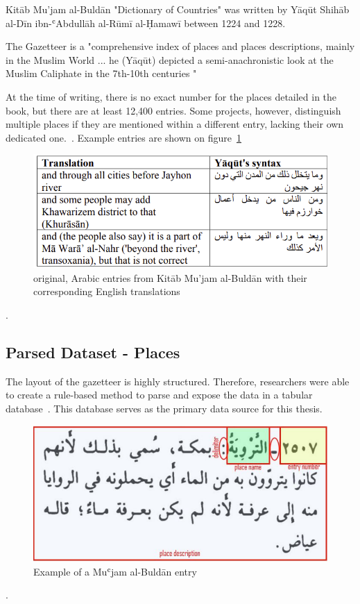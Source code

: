 Kitāb Mu'jam al-Buldān \cite{Yaqut} "Dictionary of Countries" was written by Yāqūt Shihāb al-Dīn ibn-ʿAbdullāh al-Rūmī al-Ḥamawī
between 1224 and 1228.

The Gazetteer is a "comprehensive index of places and places descriptions, mainly in the Muslim World ...
he (Yāqūt) depicted a semi-anachronistic look at the Muslim Caliphate in the 7th-10th centuries
"~\cite{YaqutRB}


At the time of writing, there is no exact number for the places detailed in the book, but there are at least 12,400 entries.
Some projects, however, distinguish multiple places if they are mentioned within a different entry, lacking
their own dedicated one.~\cite{AlTurayya}.
Example entries are shown on figure~\ref{fig:yaqut-entries}


\begin{figure}[h] %
    \centering %
    \includegraphics[width=0.7\linewidth]{figures/yaqut-with-translation} %
    \caption{original, Arabic entries from Kitāb Mu'jam al-Buldān with their corresponding English translations~\cite{YaqutRB}} %
    \label{fig:yaqut-entries} %
\end{figure}.

\subsection{Parsed Dataset - Places}\label{subsec:parsed-dataset-places}
The layout of the gazetteer is highly structured.
Therefore, researchers were able to create a rule-based method to parse
and expose the data in a tabular database~\cite{YaqutRB}.
This database serves as the primary data source for this thesis.

\begin{figure}[h] %
    \centering %
    \includegraphics[width=0.8\linewidth]{figures/yaqut-layout} %
    \caption{Example of a Muʿjam al-Buldān entry ~\cite{YaqutRB}} %
    \label{fig:yaqut-structure} %
\end{figure}.


